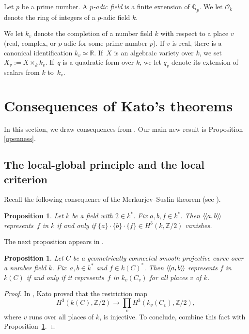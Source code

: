 \documentclass{amsart}
\newtheorem{prop}[thm]{Proposition}
\theoremstyle{definition}
\theoremstyle{remark}
\numberwithin{equation}{section}
\newcommand{\llangle}{\langle\kern-.1em\langle}
\newcommand{\rrangle}{\rangle\kern-.1em\rangle}
\def\Z{\mathbb Z}
\def\Q{\mathbb Q}
\def\R{\mathbb R}
\def\cO{\mathcal{O}}
\begin{document}
Let $p$ be a prime number. A $p$\textit{-adic field} is a finite extension of $\Q_p$. We let $\cO_k$ denote the ring of integers of a $p$-adic field $k$.

We let $k_v$ denote the completion of a number field $k$ with respect to a place $v$ (real, complex, or $p$-adic for some prime number $p$). If $v$ is real, there is a canonical identification $k_v\simeq \R$.
If~$X$ is an algebraic variety over $k$, we set $X_v:=X\times_k k_v$. If~$q$ is a quadratic form over $k$, we let $q_v$ denote its extension of scalars from $k$ to~$k_v$.


\section{Consequences of Kato's theorems}
\label{secKato}

In this section, we draw consequences from \cite{Kato}. Our main new result is Proposition \ref{openness}.


\subsection{The local-global principle and the local criterion}

Recall the following consequence of the Merkurjev--Suslin theorem (see \cite[Theorem 12.1\,a)$\Leftrightarrow$c)]{MS}).

\begin{prop}
\label{lemMS}
Let $k$ be a field with $2\in k^*$. Fix $a,b,f\in k^*$. Then  $\llangle a,b\rrangle$ represents~$f$ in $k$ if and only if  $\{a\}\cdot\{b\}\cdot\{f\}\in H^3(k,\Z/2)$ vanishes.
\end{prop}

The next proposition appears in \cite[top of p.\,146]{Kato}. 

\begin{prop}
\label{localglobal}
Let $C$ be a geometrically connected smooth projective curve over a number field $k$. Fix~$a,b\in k^*$ and $f\in k(C)^*$. Then $\llangle a,b\rrangle$ represents $f$ in $k(C)$ if and only if it represents~$f$ in $k_v(C_v)$ for all places $v$ of $k$.
\end{prop}

\begin{proof}
In \cite[Theorem 0.8\,(2)]{Kato}, Kato proved that the restriction map
$$H^3(k(C),\Z/2)\to\prod_v H^3(k_v(C_v),\Z/2),$$
where $v$ runs over all places of $k$, is injective.
To conclude, combine this fact with Proposition~\ref{lemMS}.
\end{proof}
\end{document}
